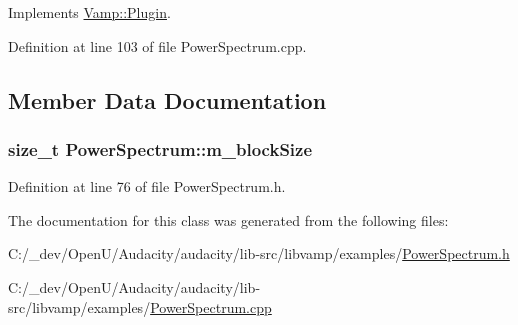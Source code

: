 Implements \hyperlink{class_vamp_1_1_plugin_aad67dc9d0052417511070c4ebcfbf24f}{Vamp\+::\+Plugin}.



Definition at line 103 of file Power\+Spectrum.\+cpp.



\subsection{Member Data Documentation}
\subsubsection[{\texorpdfstring{m\+\_\+block\+Size}{m_blockSize}}]{\setlength{\rightskip}{0pt plus 5cm}size\+\_\+t Power\+Spectrum\+::m\+\_\+block\+Size\hspace{0.3cm}{\ttfamily [protected]}}\hypertarget{class_power_spectrum_a399e997c033f26b07edb7cc83cd5a6d8}{}\label{class_power_spectrum_a399e997c033f26b07edb7cc83cd5a6d8}


Definition at line 76 of file Power\+Spectrum.\+h.



The documentation for this class was generated from the following files\+:\begin{DoxyCompactItemize}
\item 
C\+:/\+\_\+dev/\+Open\+U/\+Audacity/audacity/lib-\/src/libvamp/examples/\hyperlink{_power_spectrum_8h}{Power\+Spectrum.\+h}\item 
C\+:/\+\_\+dev/\+Open\+U/\+Audacity/audacity/lib-\/src/libvamp/examples/\hyperlink{_power_spectrum_8cpp}{Power\+Spectrum.\+cpp}\end{DoxyCompactItemize}

